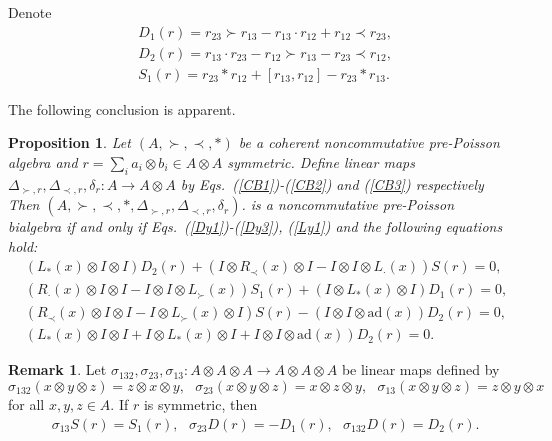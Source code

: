 \documentclass[12pt]{amsart}
\newtheorem{pro}[thm]{Proposition}
\theoremstyle{definition}
\newtheorem{rmk}[thm]{Remark}
\begin{document}
Denote 
\begin{align*}&D_{1}(r)=r_{23}\succ r_{13}-r_{13}\cdot r_{12}+r_{12}\prec r_{23},\\&
D_{2}(r)=r_{13}\cdot r_{23}-r_{12}\succ r_{13}-r_{23}\prec r_{12},
\\&S_1(r)=r_{23}\ast r_{12}+[r_{13},r_{12}]-r_{23}\ast r_{13}.\end{align*}

The following conclusion is apparent.

\begin{pro} \label{Ac4}
Let $(A,\succ,\prec,\ast)$ be a coherent noncommutative pre-Poisson algebra and $r=\sum\limits_{i}a_{i}\otimes b_{i}\in A\otimes A$ symmetric.
Define linear maps $\Delta_{\succ,r},\Delta_{\prec,r},\delta_r:A\longrightarrow A\otimes A$ 
by Eqs.~(\ref{CB1})-(\ref{CB2}) and (\ref{CB3}) respectively
Then $(A, \succ,\prec,\ast,\Delta_{\succ,r},\Delta_{\prec,r},\delta_r)$. 
 is a noncommutative pre-Poisson bialgebra if and only if
 Eqs.~(\ref{Dy1})-(\ref{Dy3}), (\ref{Ly1}) and
  the following equations hold:
\begin{align}&\label{Py1}
(L_{\ast}(x)\otimes I \otimes I)D_{2}(r)
+(I\otimes R_{\prec}(x)\otimes I-I\otimes I \otimes L_{\cdot}(x))S(r)=0,
\\&\label{Py2}
(R_{\cdot}(x)\otimes I\otimes I-I \otimes I\otimes L_{\succ}(x))S_1(r)
+(I \otimes L_{\ast}(x)\otimes I)D_{1}(r)=0,
\\&\label{Py3}
(R_{\prec}(x)\otimes I\otimes I-I \otimes L_{\succ}(x)\otimes I)S(r)
-(I \otimes I\otimes \mathrm{ad}(x))D_{2}(r)=0,
\\&\label{Py4}
(L_{\ast}(x)\otimes I \otimes I+I \otimes L_{\ast}(x)\otimes I+I \otimes I\otimes \mathrm{ad}(x))D_{2}(r)
=0.
\end{align}

\end{pro}

\begin{rmk} \label{Ac6} Let $\sigma_{132},\sigma_{23},\sigma_{13}:A\otimes A\otimes A\longrightarrow A\otimes A\otimes A$ 
be linear maps defined by
\begin{equation*}\sigma_{132}(x\otimes y\otimes z)=z\otimes x\otimes y, \ \ \
\sigma_{23}(x\otimes y\otimes z)=x\otimes z\otimes y, \ \ \
\sigma_{13}(x\otimes y\otimes z)=z\otimes y\otimes x \end{equation*}
for all $x,y,z\in A$. If $r$ is symmetric, then
\begin{align*}&\sigma_{13}S(r)=S_{1}(r),\ \ \  \sigma_{23}D(r)=-D_{1}(r),\ \ \  \sigma_{132}D(r)=D_{2}(r).\end{align*}
\end{rmk}
\end{document}

